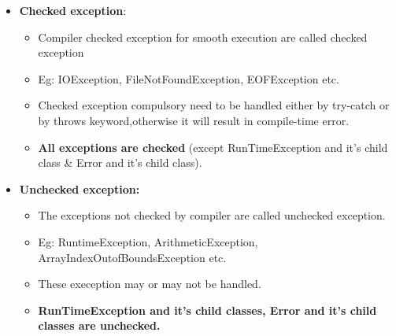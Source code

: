 \setlength{\columnsep}{3pt}
\begin{flushleft}

	\begin{itemize}
		\item \textbf{Checked exception}:
		\begin{itemize}
			\item Compiler checked exception for smooth execution are called checked exception
			\item Eg: IOException, FileNotFoundException, EOFException etc.
			\item Checked exception compulsory need to be handled either by try-catch or by throws keyword,otherwise it will result in compile-time error.
			\item \textbf{All exceptions are checked} (except RunTimeException and it's child class \& Error and it's child class).
		\end{itemize}
	
		\bigskip
		\item \textbf{Unchecked exception:}
		\begin{itemize}
			\item The exceptions not checked by compiler are called unchecked exception.
			\item Eg: RuntimeException, ArithmeticException, ArrayIndexOutofBoundsException etc.
			\item These exeception may or may not be handled.
			\item \textbf{RunTimeException and it’s child classes, Error and it’s child classes are unchecked.}
		\end{itemize}
		\bigskip
	\end{itemize}	
		\newpage
		
\end{flushleft}

\newpage




